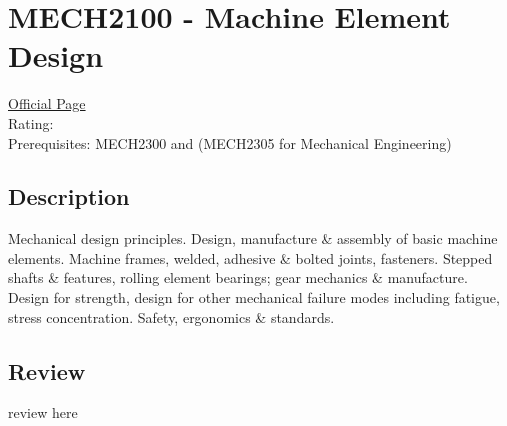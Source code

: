 \hypertarget{MECH2100}{\section{MECH2100 - Machine Element Design}}

\large
\textcolor{turbo_purple}{\href{https://my.uq.edu.au/programs-courses/course.html?course_code=MECH2100}{Official Page}} \\
Rating: \cstar\cstar\cstar\cstar\ostar \\
Prerequisites: MECH2300 and (MECH2305 for Mechanical Engineering)

\normalsize
\subsection*{Description}
Mechanical design principles.
Design, manufacture \& assembly of basic machine elements.
Machine frames, welded, adhesive \& bolted joints, fasteners.
Stepped shafts \& features, rolling element bearings; gear mechanics \& manufacture.
Design for strength, design for other mechanical failure modes including fatigue, stress concentration.
Safety, ergonomics \& standards.

\subsection*{Review}
review here
